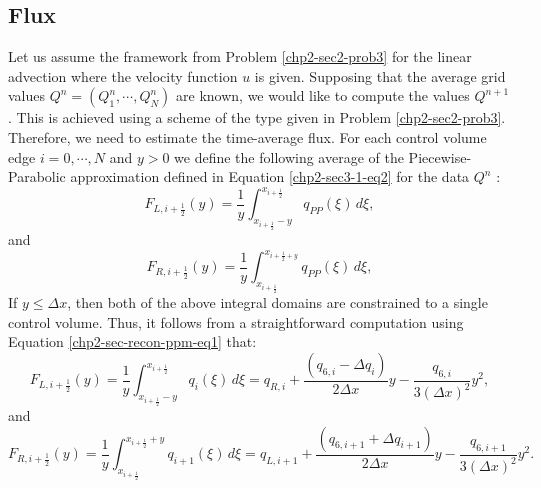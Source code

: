 \subsection{Flux}
\label{chp2-sec-flux}
Let us assume the framework from Problem \ref{chp2-sec2-prob3} for the linear advection
where the velocity function $u$ is given.
Supposing that the average grid values $Q^{n} = (Q^{n}_1, \cdots, Q^{n}_N)$ are known,
we would like to compute the values $Q^{n+1}$.
This is achieved using a scheme of the type given in Problem \ref{chp2-sec2-prob3}.
Therefore, we need to estimate the time-average flux.
For each control volume edge $i=0, \cdots, N$ and $y>0$ 
we define the following average of the Piecewise-Parabolic approximation
defined in Equation \eqref{chp2-sec3-1-eq2} for the data $Q^{n}$ \citep{colella:1984}:
\begin{equation}
	\label{chp-sec-flux:fL_1}
	F_{L,i+\frac{1}{2}}(y) = \frac{1}{y} \int_{x_{i+\frac{1}{2}}-y}^{x_{i+\frac{1}{2}}}
	q_{PP}(\xi)\,d\xi,
\end{equation}
and
\begin{equation}
	\label{chp-sec-flux:fR_1}
	F_{R,i+\frac{1}{2}}(y) = \frac{1}{y} \int_{x_{i+\frac{1}{2}}}^{x_{i+\frac{1}{2}+y}}
	q_{PP}(\xi)\,d\xi,
\end{equation}
If $y \leq \Delta x$, then both of the above integral domains
are constrained to a single control volume. Thus,
it follows from a straightforward computation using 
Equation \eqref{chp2-sec-recon-ppm-eq1} that:
\begin{equation}
	\label{chp-sec-flux:fL_2}
	F_{L,i+\frac{1}{2}}(y) = \frac{1}{y} \int_{x_{i+\frac{1}{2}}-y}^{x_{i+\frac{1}{2}}}
	q_{i}(\xi)\,d\xi = 
	q_{R,i} +\frac{(q_{6,i} - \Delta q_i)}{2\Delta x}y
	- \frac{q_{6,i}}{3(\Delta x)^2}y^2,
\end{equation}
and
\begin{equation}
	\label{chp-sec-flux:fR_2}
	F_{R,i+\frac{1}{2}}(y) = \frac{1}{y} \int_{x_{i+\frac{1}{2}}}^{x_{i+\frac{1}{2}}+y}
	q_{i+1}(\xi)\,d\xi = 
	q_{L,i+1} +\frac{(q_{6,i+1} + \Delta q_{i+1})}{2\Delta x}y
	- \frac{q_{6,i+1}}{3(\Delta x)^2}y^2.
\end{equation}

